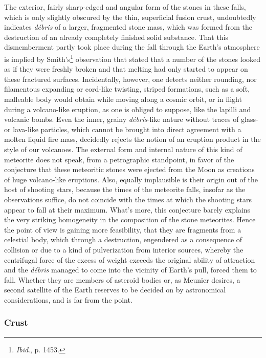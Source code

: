 \documentclass[a4paper, 12pt, oneside]{article}
\begin{document}
The exterior, fairly sharp-edged and angular form of the stones in these falls, which is only slightly obscured by the thin, superficial fusion crust, undoubtedly indicates \emph{débris} of a larger, fragmented stone mass, which was formed from the destruction of an already completely finished solid substance. That this dismemberment partly took place during the fall through the Earth's atmosphere is implied by Smith's\footnote{\emph{Ibid}., p. 1453.} observation that stated that a number of the stones looked as if they were freshly broken and that melting had only started to appear on these fractured surfaces. Incidentally, however, one detects neither rounding, nor filamentous expanding or cord-like twisting, striped formations, such as a soft, malleable body would obtain while moving along a cosmic orbit, or in flight during a volcano-like eruption, as one is obliged to suppose, like the lapilli and volcanic bombs. Even the inner, grainy \emph{débris}-like nature without traces of glass- or lava-like particles, which cannot be brought into direct agreement with a molten liquid fire mass, decidedly rejects the notion of an eruption product in the style of our volcanoes. The external form and internal nature of this kind of meteorite does not speak, from a petrographic standpoint, in favor of the conjecture that these meteoritic stones were ejected from the Moon as creations of huge volcano-like eruptions. Also, equally implausible is their origin out of the host of shooting stars, because the times of the meteorite falls, insofar as the observations suffice, do not coincide with the times at which the shooting stars appear to fall at their maximum. What's more, this conjecture barely explains the very striking homogeneity in the composition of the stone meteorites. Hence the point of view is gaining more feasibility, that they are fragments from a celestial body, which through a destruction, engendered as a consequence of collision or due to a kind of pulverization from interior sources, whereby the centrifugal force of the excess of weight exceeds the original ability of attraction and the \emph{débris} managed to come into the vicinity of Earth's pull, forced them to fall. Whether they are members of asteroid bodies or, as Meunier desires, a second satellite of the Earth reserves to be decided on by astronomical considerations, and is far from the point.
\clearpage
\subsubsection{Crust}
\end{document}
